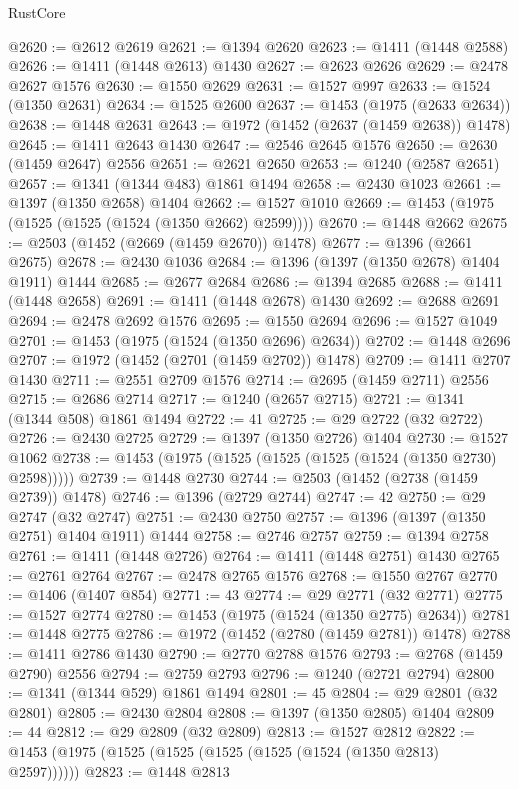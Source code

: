 \begin{lexlean}{RustCore}
\begin{coremodule}
{\begin{coremodule}
{{{{{{{{{{{{{{{{{{{{{{{{{{{{{{{{{{{{{{{{{{{{{@2620 := @2612 @2619
@2621 := @1394 @2620
@2623 := @1411 (@1448 @2588)
@2626 := @1411 (@1448 @2613) @1430
@2627 := @2623 @2626
@2629 := @2478 @2627 @1576
@2630 := @1550 @2629
@2631 := @1527 @997
@2633 := @1524 (@1350 @2631)
@2634 := @1525 @2600
@2637 := @1453 (@1975 (@2633 @2634))
@2638 := @1448 @2631
@2643 := @1972 (@1452 (@2637 (@1459 @2638)) @1478)
@2645 := @1411 @2643 @1430
@2647 := @2546 @2645 @1576
@2650 := @2630 (@1459 @2647) @2556
@2651 := @2621 @2650
@2653 := @1240 (@2587 @2651)
@2657 := @1341 (@1344 @483) @1861 @1494
@2658 := @2430 @1023
@2661 := @1397 (@1350 @2658) @1404
@2662 := @1527 @1010
@2669 := @1453 (@1975 (@1525 (@1525 (@1524 (@1350 @2662) @2599))))
@2670 := @1448 @2662
@2675 := @2503 (@1452 (@2669 (@1459 @2670)) @1478)
@2677 := @1396 (@2661 @2675)
@2678 := @2430 @1036
@2684 := @1396 (@1397 (@1350 @2678) @1404 @1911) @1444
@2685 := @2677 @2684
@2686 := @1394 @2685
@2688 := @1411 (@1448 @2658)
@2691 := @1411 (@1448 @2678) @1430
@2692 := @2688 @2691
@2694 := @2478 @2692 @1576
@2695 := @1550 @2694
@2696 := @1527 @1049
@2701 := @1453 (@1975 (@1524 (@1350 @2696) @2634))
@2702 := @1448 @2696
@2707 := @1972 (@1452 (@2701 (@1459 @2702)) @1478)
@2709 := @1411 @2707 @1430
@2711 := @2551 @2709 @1576
@2714 := @2695 (@1459 @2711) @2556
@2715 := @2686 @2714
@2717 := @1240 (@2657 @2715)
@2721 := @1341 (@1344 @508) @1861 @1494
@2722 := 41
@2725 := @29 @2722 (@32 @2722)
@2726 := @2430 @2725
@2729 := @1397 (@1350 @2726) @1404
@2730 := @1527 @1062
@2738 := @1453 (@1975 (@1525 (@1525 (@1525 (@1524 (@1350 @2730) @2598)))))
@2739 := @1448 @2730
@2744 := @2503 (@1452 (@2738 (@1459 @2739)) @1478)
@2746 := @1396 (@2729 @2744)
@2747 := 42
@2750 := @29 @2747 (@32 @2747)
@2751 := @2430 @2750
@2757 := @1396 (@1397 (@1350 @2751) @1404 @1911) @1444
@2758 := @2746 @2757
@2759 := @1394 @2758
@2761 := @1411 (@1448 @2726)
@2764 := @1411 (@1448 @2751) @1430
@2765 := @2761 @2764
@2767 := @2478 @2765 @1576
@2768 := @1550 @2767
@2770 := @1406 (@1407 @854)
@2771 := 43
@2774 := @29 @2771 (@32 @2771)
@2775 := @1527 @2774
@2780 := @1453 (@1975 (@1524 (@1350 @2775) @2634))
@2781 := @1448 @2775
@2786 := @1972 (@1452 (@2780 (@1459 @2781)) @1478)
@2788 := @1411 @2786 @1430
@2790 := @2770 @2788 @1576
@2793 := @2768 (@1459 @2790) @2556
@2794 := @2759 @2793
@2796 := @1240 (@2721 @2794)
@2800 := @1341 (@1344 @529) @1861 @1494
@2801 := 45
@2804 := @29 @2801 (@32 @2801)
@2805 := @2430 @2804
@2808 := @1397 (@1350 @2805) @1404
@2809 := 44
@2812 := @29 @2809 (@32 @2809)
@2813 := @1527 @2812
@2822 := @1453 (@1975 (@1525 (@1525 (@1525 (@1525 (@1524 (@1350 @2813) @2597))))))
@2823 := @1448 @2813
}}}}}}}}}}}}}}}}}}}}}}}}}}}}}}}}}}}}}}}}}}}}}
\end{coremodule}}
\end{coremodule}
\end{lexlean}
